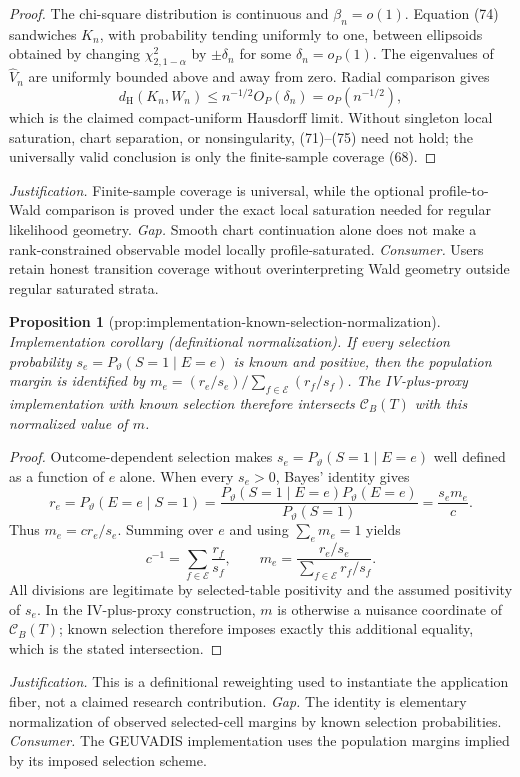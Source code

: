 \documentclass{article}
\newtheorem{proposition}{Proposition}
\begin{document}
\begin{proof}
The chi-square distribution is continuous and \(\beta_n=o(1)\).  Equation (74) sandwiches \(K_n\), with probability tending uniformly to one, between ellipsoids obtained by changing \(\chi^2_{2,1-\alpha}\) by \(\pm\delta_n\) for some \(\delta_n=o_P(1)\).  The eigenvalues of \(\widehat V_n\) are uniformly bounded above and away from zero.  Radial comparison gives
\[
 d_{\mathrm H}(K_n,W_n)
 \le n^{-1/2}O_P(\delta_n)=o_P(n^{-1/2}),                 \tag{75}
\]
which is the claimed compact-uniform Hausdorff limit.  Without singleton local saturation, chart separation, or nonsingularity, (71)--(75) need not hold; the universally valid conclusion is only the finite-sample coverage (68).
\end{proof}
\par\smallskip\noindent \textit{Justification.} Finite-sample coverage is universal, while the optional profile-to-Wald comparison is proved under the exact local saturation needed for regular likelihood geometry. \textit{Gap.} Smooth chart continuation alone does not make a rank-constrained observable model locally profile-saturated. \textit{Consumer.} Users retain honest transition coverage without overinterpreting Wald geometry outside regular saturated strata.

\begin{proposition}[prop:implementation-known-selection-normalization]\label{prop:implementation-known-selection-normalization}
Implementation corollary (definitional normalization). If every selection probability \(s_e=P_{\vartheta}(S=1\mid E=e)\) is known and positive, then the population margin is identified by \(m_e=(r_e/s_e)/\sum_{f\in\mathcal E}(r_f/s_f)\). The IV-plus-proxy implementation with known selection therefore intersects \(\mathcal C_B(T)\) with this normalized value of \(m\).
\end{proposition}
\begin{proof}
Outcome-dependent selection makes \(s_e=P_{\vartheta}(S=1\mid E=e)\) well defined as a function of \(e\) alone.  When every \(s_e>0\), Bayes' identity gives
\[
r_e=P_{\vartheta}(E=e\mid S=1)
=\frac{P_{\vartheta}(S=1\mid E=e)P_{\vartheta}(E=e)}{P_{\vartheta}(S=1)}
=\frac{s_em_e}{c}.
\]
Thus \(m_e=cr_e/s_e\).  Summing over \(e\) and using \(\sum_em_e=1\) yields
\[
c^{-1}=\sum_{f\in\mathcal E}\frac{r_f}{s_f},
\qquad
m_e=\frac{r_e/s_e}{\sum_{f\in\mathcal E}r_f/s_f}.
\]
All divisions are legitimate by selected-table positivity and the assumed positivity of \(s_e\).  In the IV-plus-proxy construction, \(m\) is otherwise a nuisance coordinate of \(\mathcal C_B(T)\); known selection therefore imposes exactly this additional equality, which is the stated intersection.
\end{proof}
\par\smallskip\noindent \textit{Justification.} This is a definitional reweighting used to instantiate the application fiber, not a claimed research contribution. \textit{Gap.} The identity is elementary normalization of observed selected-cell margins by known selection probabilities. \textit{Consumer.} The GEUVADIS implementation uses the population margins implied by its imposed selection scheme.
\end{document}
